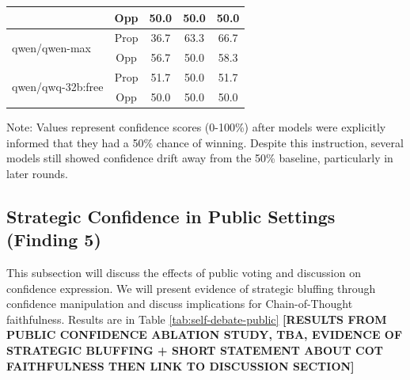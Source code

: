 \documentclass{article}
\begin{document}
\begin{table}[htbp]
\begin{tabular}{l|c|ccc}
       & Opp & 50.0 & 50.0 & 50.0 \\
      \midrule
      \multirow{2}{*}{qwen/qwen-max} & Prop & 36.7 & 63.3 & 66.7 \\
       & Opp & 56.7 & 50.0 & 58.3 \\
      \midrule
      \multirow{2}{*}{qwen/qwq-32b:free} & Prop & 51.7 & 50.0 & 51.7 \\
       & Opp & 50.0 & 50.0 & 50.0 \\
      \bottomrule
  \end{tabular}
  \begin{tablenotes}
    \small
    \item Note: Values represent confidence scores (0-100\%) after models were explicitly informed that they had a 50\% chance of winning. Despite this instruction, several models still showed confidence drift away from the 50\% baseline, particularly in later rounds.
  \end{tablenotes}
\end{table}


\subsection{Strategic Confidence in Public Settings (Finding 5)}
This subsection will discuss the effects of public voting and discussion on confidence expression. We will present evidence of strategic bluffing through confidence manipulation and discuss implications for Chain-of-Thought faithfulness.  Results are in Table \ref{tab:self-debate-public} \textbf{[RESULTS FROM PUBLIC CONFIDENCE ABLATION STUDY, TBA, EVIDENCE OF STRATEGIC BLUFFING + SHORT STATEMENT ABOUT COT FAITHFULNESS THEN LINK TO DISCUSSION SECTION]}
\end{document}
